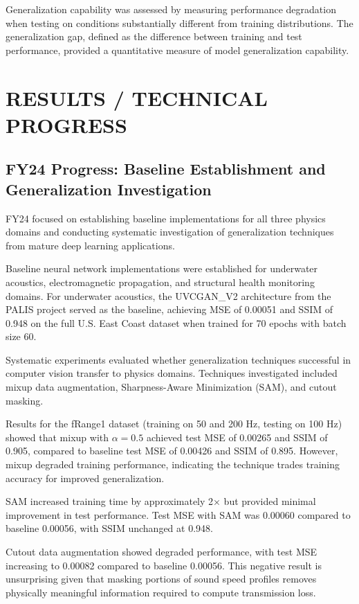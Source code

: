 \documentclass{article}
\begin{document}
Generalization capability was assessed by measuring performance degradation when testing on conditions substantially different from training distributions. The generalization gap, defined as the difference between training and test performance, provided a quantitative measure of model generalization capability.

\section{RESULTS / TECHNICAL PROGRESS}

\subsection{FY24 Progress: Baseline Establishment and Generalization Investigation}

FY24 focused on establishing baseline implementations for all three physics domains and conducting systematic investigation of generalization techniques from mature deep learning applications.

Baseline neural network implementations were established for underwater acoustics, electromagnetic propagation, and structural health monitoring domains. For underwater acoustics, the UVCGAN\_V2 architecture from the PALIS project served as the baseline, achieving MSE of 0.00051 and SSIM of 0.948 on the full U.S. East Coast dataset when trained for 70 epochs with batch size 60.

Systematic experiments evaluated whether generalization techniques successful in computer vision transfer to physics domains. Techniques investigated included mixup data augmentation, Sharpness-Aware Minimization (SAM), and cutout masking.

Results for the fRange1 dataset (training on 50 and 200 Hz, testing on 100 Hz) showed that mixup with $\alpha=0.5$ achieved test MSE of 0.00265 and SSIM of 0.905, compared to baseline test MSE of 0.00426 and SSIM of 0.895. However, mixup degraded training performance, indicating the technique trades training accuracy for improved generalization.

SAM increased training time by approximately 2× but provided minimal improvement in test performance. Test MSE with SAM was 0.00060 compared to baseline 0.00056, with SSIM unchanged at 0.948.

Cutout data augmentation showed degraded performance, with test MSE increasing to 0.00082 compared to baseline 0.00056. This negative result is unsurprising given that masking portions of sound speed profiles removes physically meaningful information required to compute transmission loss.
\end{document}
